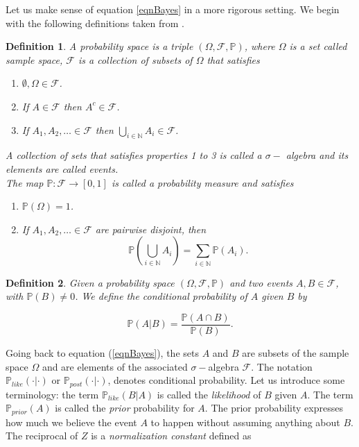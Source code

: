 \documentclass[12pt]{book}
\newtheorem{definition}{Definition}
\newcommand{\post}{\mathbb{P}_{post}}
\newcommand{\like}{\mathbb{P}_{like}}
\newcommand{\prior}{\mathbb{P}_{prior}}
\newcommand{\p}{\mathbb{P}}
\begin{document}
Let us make sense of  equation \ref{eqnBayes} in a more rigorous setting. 
We begin with the following definitions taken from
\cite{dudley2002real}.
\begin{definition}\label{dfnprobabilitytriple}
A probability space is a triple $(\Omega,\mathscr{F},\p)$, where $\Omega$ is a set called 
sample space, $\mathscr{F}$ is a collection of subsets of $\Omega$ that satisfies
\begin{enumerate}
\item $\emptyset,\Omega\in\mathscr{F}$.
\item If $A\in\mathscr{F}$ then $A^{c}\in\mathscr{F}$.
\item If $A_{1},A_{2},\ldots \in\mathscr{F}$ then $\bigcup_{i\in\mathbb{N}}A_{i}\in\mathscr{F}$.
\end{enumerate}
A  collection of sets that satisfies properties 1 to 3 is called a $\sigma-$ algebra and its elements are called
events. 
\\
The map $\p:\mathscr{F}\rightarrow [0,1]$ is called a probability measure and satisfies
\begin{enumerate}
\item $\p(\Omega)=1$.
\item If $A_{1},A_{2},\ldots \in\mathscr{F}$ are pairwise disjoint, then 
\begin{equation*}
\p(\bigcup_{i\in\mathbb{N}}A_{i})=\sum_{i\in\mathbb{N}}\p(A_{i}).
\end{equation*}
\end{enumerate}
\end{definition}

\begin{definition}
Given a probability space $(\Omega,\mathscr{F},\p)$ and two events $A,B\in\mathscr{F}$, with $\p(B)\neq 0$. 
We define the conditional probability of $A$ given $B$ by

\begin{equation*}
\p(A|B)=\frac{\p(A\cap B)}{\p(B)}.
\end{equation*}
\end{definition}



Going back to equation (\ref{eqnBayes}), the sets $A$ and $B$ are subsets of the sample space $\Omega$ and 
are elements of the associated $\sigma-$algebra $\mathscr{F}$. The  notation
 $\like(\cdot|\cdot)$ or $\post(\cdot|\cdot)$, denotes conditional probability. Let us introduce some terminology:
 the term $\like(B|A)$ is called the \textit{likelihood} of $B$ given $A$. The term $\prior(A)$ is called the 
\textit{prior} probability for $A$. The prior probability expresses how much we believe the event $A$ 
to happen without assuming
anything about  $B$. The reciprocal of $Z$ is a \textit{normalization constant} defined as 
\end{document}
